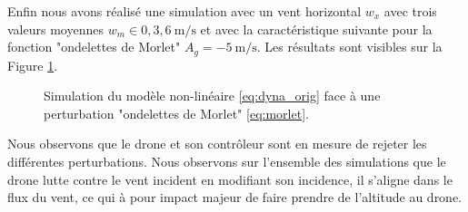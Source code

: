 Enfin nous avons réalisé une simulation avec un vent horizontal $w_x$ avec trois valeurs moyennes $w_{m} \in {0,3,6}\SI{}{\meter\per\second}$ et avec la caractéristique suivante pour la fonction "ondelettes de Morlet" $A_g=\SI{-5}{\meter\per\second}$. Les résultats sont visibles sur la Figure \ref{fig:sim_morlet}.

\begin{figure}[h]
    \centering
    \caption{Simulation du modèle non-linéaire \eqref{eq:dyna_orig} face à une perturbation "ondelettes de Morlet" \eqref{eq:morlet}.}
    \label{fig:sim_morlet}
\end{figure}
Nous observons que le drone et son contrôleur sont en mesure de rejeter les différentes perturbations.
Nous observons sur l'ensemble des simulations que le drone lutte contre le vent incident en modifiant son incidence, il s'aligne dans le flux du vent, ce qui à pour impact majeur de faire prendre de l'altitude au drone.


